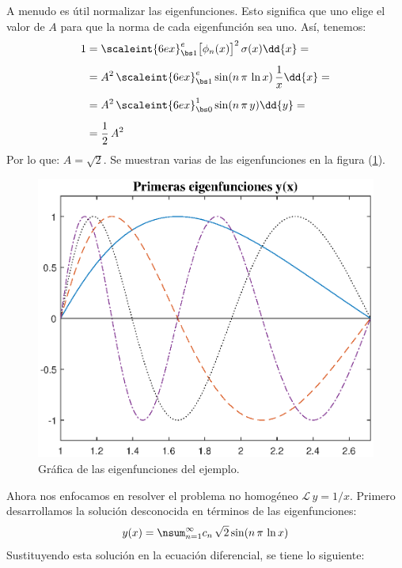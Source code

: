 \begin{ejemplo}
A menudo es útil normalizar las eigenfunciones. Esto significa que uno elige el valor de $A$ para que la norma de cada eigenfunción sea uno. Así, tenemos:
\begin{align}
\begin{aligned}[b]
1 &= \scaleint{6ex}_{\bs 1}^{e} \big[ \phi_{n} (x) \big]^{2} \, \sigma (x) \dd{x} = \\[0.5em]
&= A^{2} \, \scaleint{6ex}_{\bs 1}^{e} \sin (n \, \pi \, \ln x) \, \dfrac{1}{x} \dd{x} = \\[0.5em]
&= A^{2} \, \scaleint{6ex}_{\bs 0}^{1} \sin (n \, \pi \, y) \dd{y} = \\[0.5em]
&= \dfrac{1}{2} \, A^{2}
\end{aligned}
\label{eq:ecuacion_04_27}
\end{align}
Por lo que: $A = \sqrt{2}$. Se muestran varias de las eigenfunciones en la figura (\ref{fig:figura_04_02}).
\begin{figure}[H]
    \centering
    \includegraphics[scale=1]{Imagenes/Expansion_Eigenfunciones_01.eps}
    \caption{Gráfica de las eigenfunciones del ejemplo.}
    \label{fig:figura_04_02}
\end{figure}
Ahora nos enfocamos en resolver el problema no homogéneo $\mathcal{L} \, y = 1 / x$. Primero desarrollamos la solución desconocida en términos de las eigenfunciones:
\begin{align*}
y (x) = \nsum_{n=1}^{\infty} c_{n} \, \sqrt{2} \sin (n \, \pi \, \ln x)
\end{align*}
Sustituyendo esta solución en la ecuación diferencial, se tiene lo siguiente:

\end{ejemplo}
